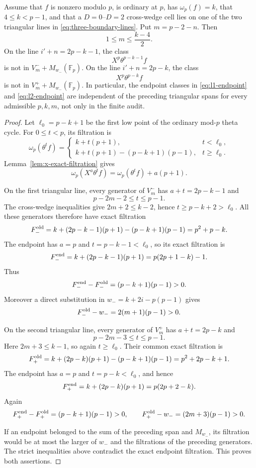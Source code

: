\begin{proposition}
\label{prop:triangular-endpoint-independent}
Assume that $f$ is nonzero modulo $p$, is ordinary at $p$, has
$\omega_p(f)=k$, that $4\leq k<p-1$, and that a
$D=0$--$D=2$ cross-wedge cell lies on one of the two triangular lines in
\eqref{eq:three-boundary-lines}.  Put $m=p-2-n$.  Then
\[
 1\leq m\leq \frac{k-4}{2}.
\]
On the line $i'+n=2p-k-1$, the class
\[
 X^p\theta^{p-k-1}f
\]
is not in $V_m^-+M_{w_-}(\mathbb F_p)$.  On the line
$i'+n=2p-k$, the class
\[
 X^p\theta^{p-k}f
\]
is not in $V_m^++M_{w_-}(\mathbb F_p)$.  In particular, the endpoint
classes in \eqref{eq:l1-endpoint} and \eqref{eq:l2-endpoint} are
independent of the preceding triangular spans for every admissible
$p,k,m$, not only in the finite audit.
\end{proposition}

\begin{proof}
Let $\ell_0=p-k+1$ be the first low point of the ordinary mod-$p$ theta
cycle.  For $0\leq t<p$, its filtration is
\[
 \omega_p(\theta^t f)=
 \begin{cases}
  k+t(p+1),&t<\ell_0,\\
  k+t(p+1)-(p-k+1)(p-1),&t\geq\ell_0.
 \end{cases}
\]
Lemma~\ref{lem:x-exact-filtration} gives
\[
 \omega_p(X^a\theta^t f)=\omega_p(\theta^t f)+a(p+1).
\]

On the first triangular line, every generator of $V_m^-$ has
$a+t=2p-k-1$ and
\[
 p-2m-2\leq t\leq p-1.
\]
The cross-wedge inequalities give $2m+2\leq k-2$, hence
$t\geq p-k+2>\ell_0$.  All these generators therefore have exact
filtration
\[
 F_-^{\rm old}=k+(2p-k-1)(p+1)-(p-k+1)(p-1)
                 =p^2+p-k.
\]
The endpoint has $a=p$ and $t=p-k-1<\ell_0$, so its exact filtration is
\[
 F_-^{\rm end}=k+(2p-k-1)(p+1)=p(2p+1-k)-1.
\]
Thus
\[
 F_-^{\rm end}-F_-^{\rm old}=(p-k+1)(p-1)>0.
\]
Moreover a direct substitution in
$w_-=k+2i-p(p-1)$ gives
\[
 F_-^{\rm old}-w_-=2(m+1)(p-1)>0.
\]

On the second triangular line, every generator of $V_m^+$ has
$a+t=2p-k$ and
\[
 p-2m-3\leq t\leq p-1.
\]
Here $2m+3\leq k-1$, so again $t\geq\ell_0$.  Their common exact
filtration is
\[
 F_+^{\rm old}=k+(2p-k)(p+1)-(p-k+1)(p-1)
                 =p^2+2p-k+1.
\]
The endpoint has $a=p$ and $t=p-k<\ell_0$, and hence
\[
 F_+^{\rm end}=k+(2p-k)(p+1)=p(2p+2-k).
\]
Again
\[
 F_+^{\rm end}-F_+^{\rm old}=(p-k+1)(p-1)>0,
 \qquad
 F_+^{\rm old}-w_-=(2m+3)(p-1)>0.
\]

If an endpoint belonged to the sum of the preceding span and
$M_{w_-}$, its filtration would be at most the larger of $w_-$ and the
filtrations of the preceding generators.  The strict inequalities above
contradict the exact endpoint filtration.  This proves both assertions.
\end{proof}

